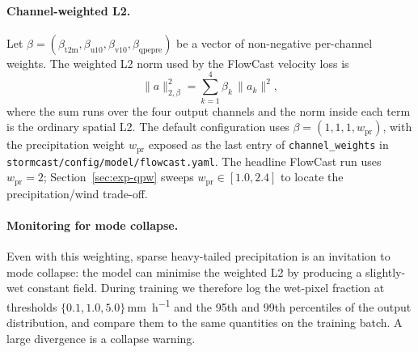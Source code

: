 \paragraph{Channel-weighted L2.} Let $\beta = (\beta_{\text{t2m}}, \beta_{\text{u10}}, \beta_{\text{v10}}, \beta_{\text{qpepre}})$ be a vector of non-negative per-channel weights. The weighted L2 norm used by the FlowCast velocity loss is
\begin{equation}
  \|a\|_{2,\beta}^2 = \sum_{k=1}^{4} \beta_k\,\|a_k\|^2,
\end{equation}
where the sum runs over the four output channels and the norm inside each term is the ordinary spatial L2. The default configuration uses $\beta = (1, 1, 1, w_{\text{pr}})$, with the precipitation weight $w_{\text{pr}}$ exposed as the last entry of \texttt{channel\_weights} in \texttt{stormcast/config/model/flowcast.yaml}. The headline FlowCast run uses $w_{\text{pr}} = 2$; Section~\ref{sec:exp-qpw} sweeps $w_{\text{pr}} \in [1.0, 2.4]$ to locate the precipitation/wind trade-off.

\paragraph{Monitoring for mode collapse.} Even with this weighting, sparse heavy-tailed precipitation is an invitation to mode collapse: the model can minimise the weighted L2 by producing a slightly-wet constant field. During training we therefore log the wet-pixel fraction at thresholds $\{0.1, 1.0, 5.0\}$\,\si{\milli\metre\per\hour} and the 95th and 99th percentiles of the output distribution, and compare them to the same quantities on the training batch. A large divergence is a collapse warning.
